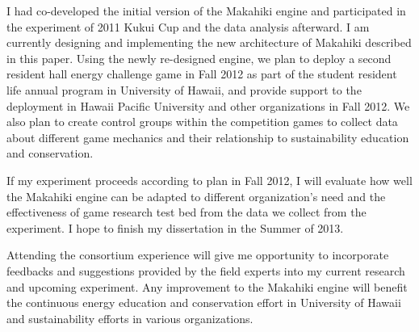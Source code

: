 \documentclass{acm_proc_article-sp}
\begin{document}
I had co-developed the initial version of the Makahiki engine and participated in the experiment of 2011 Kukui Cup and the data analysis afterward. I  am currently designing and implementing the new architecture of Makahiki described in this paper. Using the newly re-designed engine, we plan to deploy a second resident hall energy challenge game in Fall 2012 as part of the student resident life annual program in University of Hawaii, and provide support to the deployment in Hawaii Pacific University and other organizations in Fall 2012. We also plan to create control groups within the competition games to collect data about different game mechanics and their relationship to sustainability education and conservation. 

If my experiment proceeds according to plan in Fall 2012, I will evaluate how well the Makahiki engine can be adapted to different organization's need and the effectiveness of game research test bed from the data we collect from the experiment. I hope to finish my dissertation in the Summer of 2013. 

Attending the consortium experience will give me opportunity to incorporate feedbacks and suggestions provided by the field experts into my current research and upcoming experiment. Any improvement to the Makahiki engine will benefit the continuous energy education and conservation effort in University of Hawaii and sustainability efforts in various organizations.


  

\balancecolumns
\end{document}
